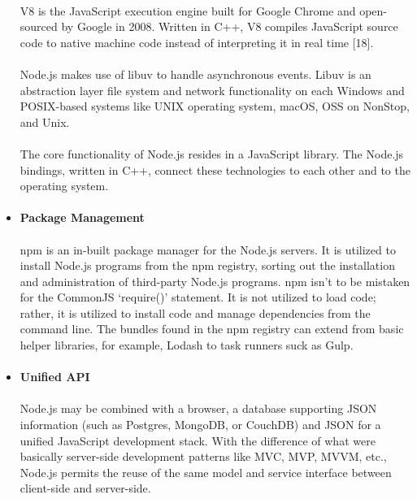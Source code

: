 \documentclass[../thesis.tex]{subfiles}
\begin{document}
\begin{itemize}
    \paragraph{}
    V8 is the JavaScript execution engine built for Google Chrome and open-sourced by Google in 2008. Written in C++, V8 compiles JavaScript source code to native machine code instead of interpreting it in real time [18].
    \paragraph{}
    Node.js makes use of libuv to handle asynchronous events. Libuv is an abstraction layer file system and network functionality on each Windows and POSIX-based systems like UNIX operating system, macOS, OSS on NonStop, and Unix.
    \paragraph{}
    The core functionality of Node.js resides in a JavaScript library. The Node.js bindings, written in C++, connect these technologies to each other and to the operating system.
    \paragraph{}
    \item \textbf{Package Management}
    \paragraph{}
    npm is an in-built package manager for the Node.js servers. It is utilized to install Node.js programs from the npm registry, sorting out the installation and administration of third-party Node.js programs. npm isn't to be mistaken for the CommonJS ‘require()’ statement. It is not utilized to load code; rather, it is utilized to install code and manage dependencies from the command line. The bundles found in the npm registry can extend from basic helper libraries, for example, Lodash to task runners suck as Gulp.
    \paragraph{}
    \item \textbf{Unified API}
    \paragraph{}
    Node.js may be combined with a browser, a database supporting JSON information (such as Postgres, MongoDB, or CouchDB) and JSON for a unified JavaScript development stack. With the difference of what were basically server-side development patterns like MVC, MVP, MVVM, etc., Node.js permits the reuse of the same model and service interface between client-side and server-side.

\end{itemize}
\end{document}
